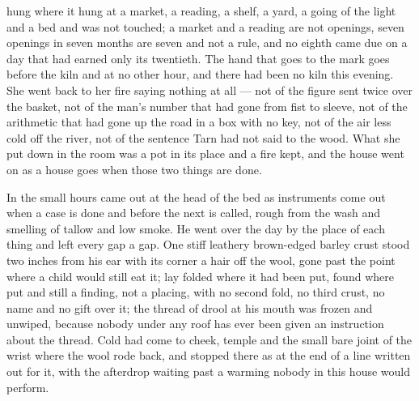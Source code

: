  hung where it hung at a market, a reading, a shelf, a yard, a going of the light and a bed and was not touched; a market and a reading are not openings, seven openings in seven months are seven and not a rule, and no eighth came due on a day that had earned only its twentieth. The hand that goes to the mark goes before the kiln and at no other hour, and there had been no kiln this evening. She went back to her fire saying nothing at all --- not of the figure sent twice over the basket, not of the man's number that had gone from fist to sleeve, not of the arithmetic that had gone up the road in a box with no key, not of the air less cold off the river, not of the sentence Tarn had not said to the wood. What she put down in the room was a pot in its place and a fire kept, and the house went on as a house goes when those two things are done.

\scenebreak

In the small hours  came out at the head of the bed as instruments come out when a case is done and before the next is called, rough from the wash and smelling of tallow and low smoke. He went over the day by the place of each thing and left every gap a gap. One stiff leathery brown-edged barley crust stood two inches from his ear with its corner a hair off the wool, gone past the point where a child would still eat it;  lay folded where it had been put, found where put and still a finding, not a placing, with no second fold, no third crust, no name and no gift over it; the thread of drool at his mouth was frozen and unwiped, because nobody under any roof has ever been given an instruction about the thread. Cold had come to cheek, temple and the small bare joint of the wrist where the wool rode back, and stopped there as at the end of a line written out for it, with the afterdrop waiting past a warming nobody in this house would perform.

